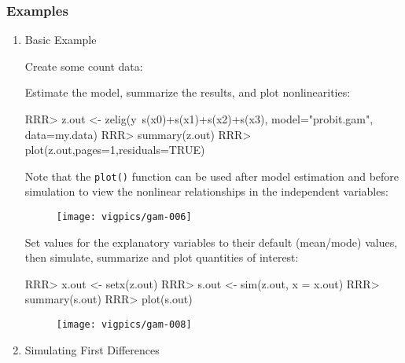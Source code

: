 \subsubsection{Examples}
\begin{enumerate}
\item Basic Example

Create some count data:

\begin{Schunk}
\end{Schunk}

Estimate the model, summarize the results, and plot nonlinearities:

\begin{Schunk}
\begin{Sinput}
RRR> z.out <- zelig(y~s(x0)+s(x1)+s(x2)+s(x3), model="probit.gam", data=my.data)
RRR> summary(z.out)
RRR> plot(z.out,pages=1,residuals=TRUE)
\end{Sinput}
\end{Schunk}
Note that the {\tt plot()} function can be used after model estimation and before simulation to view the nonlinear relationships in the independent variables: 

\begin{figure}[here]
\centering
\texttt{[image: vigpics/gam-006]}
\label{fig:plotgam}
\end{figure}

Set values for the explanatory variables to their default (mean/mode) values, then simulate, summarize and plot quantities of interest:
\begin{Schunk}
\begin{Sinput}
RRR>  x.out <- setx(z.out)
RRR>  s.out <- sim(z.out, x = x.out) 
RRR>  summary(s.out) 
RRR>  plot(s.out) 
\end{Sinput}
\end{Schunk}

\begin{figure}[here]
\centering
\texttt{[image: vigpics/gam-008]}
\label{fig:plotgam}
\end{figure}

\item Simulating First Differences


\end{enumerate}
